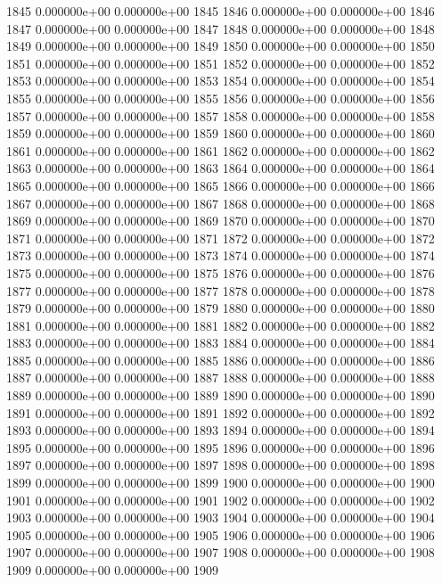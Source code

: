 \documentclass{article}
\begin{document}
\begin{Schunk}
\begin{Soutput}
1845   0.000000e+00   0.000000e+00 1845
1846   0.000000e+00   0.000000e+00 1846
1847   0.000000e+00   0.000000e+00 1847
1848   0.000000e+00   0.000000e+00 1848
1849   0.000000e+00   0.000000e+00 1849
1850   0.000000e+00   0.000000e+00 1850
1851   0.000000e+00   0.000000e+00 1851
1852   0.000000e+00   0.000000e+00 1852
1853   0.000000e+00   0.000000e+00 1853
1854   0.000000e+00   0.000000e+00 1854
1855   0.000000e+00   0.000000e+00 1855
1856   0.000000e+00   0.000000e+00 1856
1857   0.000000e+00   0.000000e+00 1857
1858   0.000000e+00   0.000000e+00 1858
1859   0.000000e+00   0.000000e+00 1859
1860   0.000000e+00   0.000000e+00 1860
1861   0.000000e+00   0.000000e+00 1861
1862   0.000000e+00   0.000000e+00 1862
1863   0.000000e+00   0.000000e+00 1863
1864   0.000000e+00   0.000000e+00 1864
1865   0.000000e+00   0.000000e+00 1865
1866   0.000000e+00   0.000000e+00 1866
1867   0.000000e+00   0.000000e+00 1867
1868   0.000000e+00   0.000000e+00 1868
1869   0.000000e+00   0.000000e+00 1869
1870   0.000000e+00   0.000000e+00 1870
1871   0.000000e+00   0.000000e+00 1871
1872   0.000000e+00   0.000000e+00 1872
1873   0.000000e+00   0.000000e+00 1873
1874   0.000000e+00   0.000000e+00 1874
1875   0.000000e+00   0.000000e+00 1875
1876   0.000000e+00   0.000000e+00 1876
1877   0.000000e+00   0.000000e+00 1877
1878   0.000000e+00   0.000000e+00 1878
1879   0.000000e+00   0.000000e+00 1879
1880   0.000000e+00   0.000000e+00 1880
1881   0.000000e+00   0.000000e+00 1881
1882   0.000000e+00   0.000000e+00 1882
1883   0.000000e+00   0.000000e+00 1883
1884   0.000000e+00   0.000000e+00 1884
1885   0.000000e+00   0.000000e+00 1885
1886   0.000000e+00   0.000000e+00 1886
1887   0.000000e+00   0.000000e+00 1887
1888   0.000000e+00   0.000000e+00 1888
1889   0.000000e+00   0.000000e+00 1889
1890   0.000000e+00   0.000000e+00 1890
1891   0.000000e+00   0.000000e+00 1891
1892   0.000000e+00   0.000000e+00 1892
1893   0.000000e+00   0.000000e+00 1893
1894   0.000000e+00   0.000000e+00 1894
1895   0.000000e+00   0.000000e+00 1895
1896   0.000000e+00   0.000000e+00 1896
1897   0.000000e+00   0.000000e+00 1897
1898   0.000000e+00   0.000000e+00 1898
1899   0.000000e+00   0.000000e+00 1899
1900   0.000000e+00   0.000000e+00 1900
1901   0.000000e+00   0.000000e+00 1901
1902   0.000000e+00   0.000000e+00 1902
1903   0.000000e+00   0.000000e+00 1903
1904   0.000000e+00   0.000000e+00 1904
1905   0.000000e+00   0.000000e+00 1905
1906   0.000000e+00   0.000000e+00 1906
1907   0.000000e+00   0.000000e+00 1907
1908   0.000000e+00   0.000000e+00 1908
1909   0.000000e+00   0.000000e+00 1909

\end{Soutput}
\end{Schunk}
\end{document}

